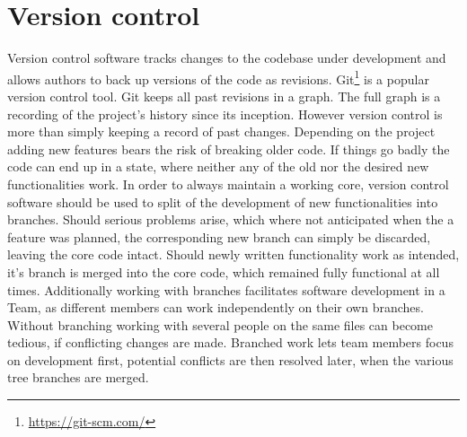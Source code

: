 \section{Version control}
Version control software tracks changes to the codebase under development and allows authors to back up versions of the code as revisions. Git\footnote{\url{https://git-scm.com/}} is a popular version control tool. Git keeps all past revisions in a graph. The full graph is a recording of the project's history since its inception. However version control is more than simply keeping a record of past changes. Depending on the project adding new features bears the risk of breaking older code. If things go badly the code can end up in a state, where neither any of the old nor the desired new functionalities work. In order to always maintain a working core, version control software should be used to split of the development of new functionalities into branches. Should serious problems arise, which where not anticipated when the a feature was planned, the corresponding new branch can simply be discarded, leaving the core code intact. Should newly written functionality work as intended, it's branch is merged into the core code, which remained fully functional at all times.
Additionally working with branches facilitates software development in a Team, as different members can work independently on their own branches. Without branching working with several people on the same files can become tedious, if conflicting changes are made. Branched work lets team members focus on development first, potential conflicts are then resolved later, when the various tree branches are merged.